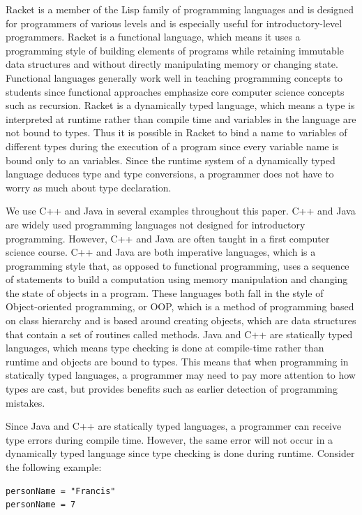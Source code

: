 \documentclass{sig-alternate}
\begin{document}
Racket is a member of the Lisp family of programming languages and is designed for programmers of various levels and is especially useful for introductory-level programmers.
Racket is a functional language, which means it uses a programming style of building elements of programs while retaining immutable data structures 
and without directly manipulating memory or changing state.
Functional languages generally work well in teaching programming concepts to students since functional approaches emphasize core computer science concepts such as recursion.
Racket is a dynamically typed language, which means a type is interpreted at runtime rather than compile time and variables in the language are not bound to types.
Thus it is possible in Racket to bind a name to variables of different types during the execution of a program since every variable name is bound only to an variables.
Since the runtime system of a dynamically typed language deduces type and type conversions, a programmer does not have to worry as much about type declaration.

We use C++ and Java in several examples throughout this paper.
C++ and Java are widely used programming languages not designed for introductory programming.
However, C++ and Java are often taught in a first computer science course.
C++ and Java are both imperative languages, which is a programming style that, as opposed to functional programming, uses a sequence of statements to build a computation using memory manipulation and changing the state of objects in a program.
These languages both fall in the style of Object-oriented programming, or OOP, which is a method of programming based on class hierarchy and is based around creating objects, which are data structures that contain a set of routines called methods. 
Java and C++ are statically typed languages, which means type checking is done at compile-time rather than runtime and objects are bound to types. 
This means that when programming in statically typed languages, a programmer may need to pay more attention to how types are cast, but provides benefits such as earlier detection of programming mistakes.

Since Java and C++ are statically typed languages, a programmer can receive type errors during compile time.
However, the same error will not occur in a dynamically typed language since type checking is done during runtime.
Consider the following example:

\begin{verbatim}
personName = "Francis"
personName = 7
\end{verbatim}
\end{document}
